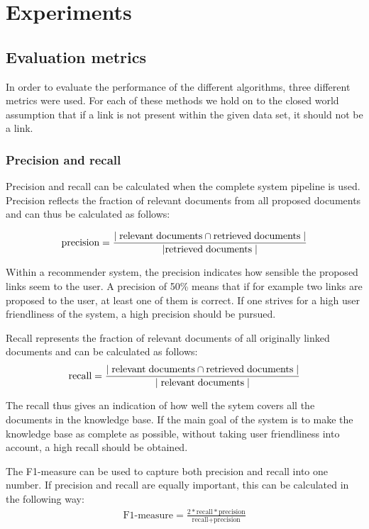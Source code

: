\section{Experiments}
\label{sec:experiments}
\subsection{Evaluation metrics}
In order to evaluate the performance of the different algorithms, three different metrics were used. For each of these methods we hold on to the closed world assumption that if a link is not present within the given data set, it should not be a link. 

\subsubsection{Precision and recall} 
Precision and recall can be calculated when the complete system pipeline is used. Precision reflects the fraction of relevant documents from all proposed documents and can thus be calculated as follows:

\begin{align*}
  \textrm{precision} = \frac{|\;\textrm{relevant\;documents} \cap \textrm{retrieved\;documents}\;|}{|\textrm{retrieved\;documents}\;|}
\end{align*}

Within a recommender system, the precision indicates how sensible the proposed links seem to the user. A precision of 50\% means that if for example two links are proposed to the user, at least one of them is correct. If one strives for a high user friendliness of the system, a high precision should be pursued. 

Recall represents the fraction of relevant documents of all originally linked documents and can be calculated as follows:
\begin{align}
  \nonumber \textrm{recall} = \frac{|\;\textrm{relevant\;documents} \cap \textrm{retrieved\;documents}\;|}{|\;\textrm{relevant\;documents}\;|}
\end{align}

The recall thus gives an indication of how well the sytem covers all the documents in the knowledge base. If the main goal of the system is to make the knowledge base as complete as possible, without taking user friendliness into account, a high recall should be obtained. 

The F1-measure can be used to capture both precision and recall into one number. If precision and recall are equally important, this can be calculated in the following way:
\begin{align}
  \nonumber \textrm{F1-measure} = \frac{2*\textrm{recall}*\textrm{precision}}{\textrm{recall} + \textrm{precision}}
\end{align}

